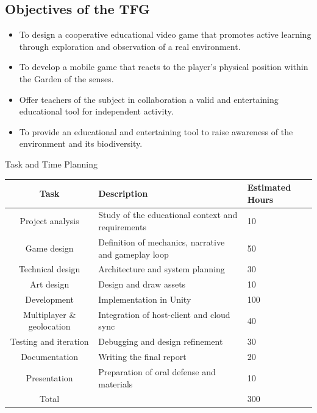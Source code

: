 \subsection{Objectives of the TFG}
\begin{itemize}
    \item To design a cooperative educational video game that promotes active learning through exploration and observation of a real environment.
    \item To develop a mobile game that reacts to the player's physical position within the Garden of the senses.
    \item Offer teachers of the subject in collaboration a valid and entertaining educational tool for independent activity.
    \item To provide an educational and entertaining tool to raise awareness of the environment and its biodiversity.
\end{itemize}



\begin{tablebox}{Task and Time Planning}
\begin{tabulary}{\linewidth}{c L L}
    \textbf{Task} & \textbf{Description} & \textbf{Estimated Hours} \\
    \hline
    Project analysis & Study of the educational context and requirements & 10 \\
    Game design & Definition of mechanics, narrative and gameplay loop & 50 \\
    Technical design & Architecture and system planning & 30 \\
    Art design & Design and draw assets & 10 \\
    Development & Implementation in Unity & 100 \\
    Multiplayer \& geolocation & Integration of host-client and cloud sync & 40 \\
    Testing and iteration & Debugging and design refinement & 30 \\
    Documentation & Writing the final report & 20 \\
    Presentation & Preparation of oral defense and materials & 10 \\
    Total &  & 300 \\
\end{tabulary}
\end{tablebox}


